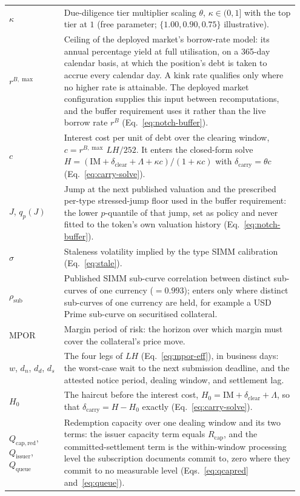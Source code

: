 \begin{longtable}{@{}p{0.18\linewidth} p{0.77\linewidth}@{}}
$\kappa$ & Due-diligence tier multiplier scaling $\theta$, $\kappa\in(0,1]$ with the top tier at $1$ (free parameter; $\{1.00,0.90,0.75\}$ illustrative).\\
$r^{B,\max}$ & Ceiling of the deployed market's borrow-rate model: its annual percentage yield at full utilisation, on a 365-day calendar basis, at which the position's debt is taken to accrue every calendar day. A kink rate qualifies only where no higher rate is attainable. The deployed market configuration supplies this input between recomputations, and the buffer requirement uses it rather than the live borrow rate $r^B$ (Eq.~\eqref{eq:notch-buffer}).\\
$c$ & Interest cost per unit of debt over the clearing window, $c = r^{B,\max}\,LH/252$. It enters the closed-form solve $H = (\mathrm{IM}+\delta_{\mathrm{clear}}+\Lambda+\kappa c)/(1+\kappa c)$ with $\delta_{\mathrm{carry}} = \theta c$ (Eq.~\eqref{eq:carry-solve}).\\
$J$, $q_p(J)$ & Jump at the next published valuation and the prescribed per-type stressed-jump floor used in the buffer requirement: the lower $p$-quantile of that jump, set as policy and never fitted to the token's own valuation history (Eq.~\eqref{eq:notch-buffer}).\\
$\hat\sigma$ & Staleness volatility implied by the type SIMM calibration (Eq.~\eqref{eq:stale}).\\
$\rho_{\mathrm{sub}}$ & Published SIMM sub-curve correlation between distinct sub-curves of one currency ($=0.993$); enters only where distinct sub-curves of one currency are held, for example a USD Prime sub-curve on securitised collateral.\\
MPOR & Margin period of risk: the horizon over which margin must cover the collateral's price move.\\
$w$, $d_n$, $d_d$, $d_s$ & The four legs of $LH$ (Eq.~\eqref{eq:mpor-eff}), in business days: the worst-case wait to the next submission deadline, and the attested notice period, dealing window, and settlement lag.\\
$H_0$ & The haircut before the interest cost, $H_0 = \mathrm{IM}+\delta_{\mathrm{clear}}+\Lambda$, so that $\delta_{\mathrm{carry}} = H - H_0$ exactly (Eq.~\eqref{eq:carry-solve}).\\
$Q_{\mathrm{cap,red}}$, $Q_{\mathrm{issuer}}$, $Q_{\mathrm{queue}}$ & Redemption capacity over one dealing window and its two terms: the issuer capacity term equals $R_{\mathrm{cap}}$, and the committed-settlement term is the within-window processing level the subscription documents commit to, zero where they commit to no measurable level (Eqs.~\eqref{eq:qcapred} and~\eqref{eq:queue}).\\

\end{longtable}
